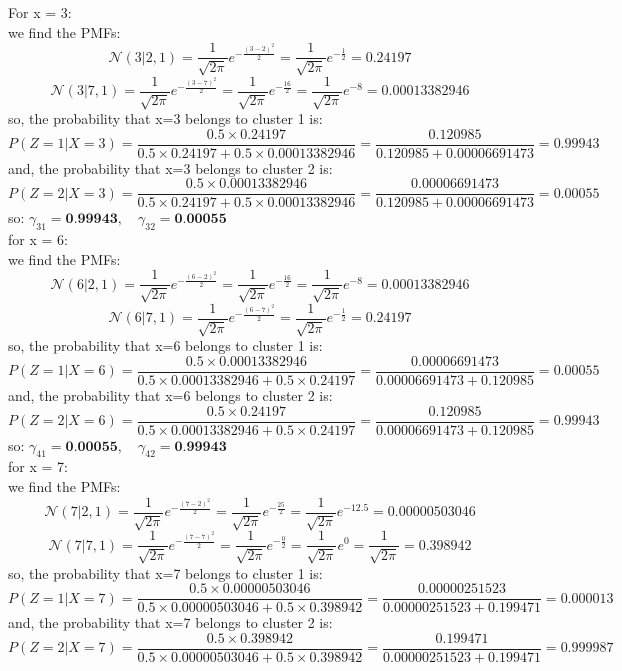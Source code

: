 \documentclass{article}
\begin{document}
\begin{enumerate}
For x = 3:
\\ we find the PMFs:
\[
\mathcal{N}(3 | 2, 1) = \frac{1}{\sqrt{2\pi}} e^{-\frac{(3-2)^2}{2}} = \frac{1}{\sqrt{2\pi}} e^{-\frac{1}{2}} = 0.24197
\]
\[
\mathcal{N}(3 | 7, 1) = \frac{1}{\sqrt{2\pi}} e^{-\frac{(3-7)^2}{2}} = \frac{1}{\sqrt{2\pi}} e^{-\frac{16}{2}} = \frac{1}{\sqrt{2\pi}} e^{-8} = 0.00013382946
\]
so, the probability that x=3 belongs to cluster 1 is:
\[
P(Z = 1 | X = 3) = \frac{0.5 \times 0.24197}{0.5 \times 0.24197 + 0.5 \times 0.00013382946} = \frac{0.120985}{0.120985 + 0.00006691473} = 0.99943
\]
and, the probability that x=3 belongs to cluster 2 is:
\[
P(Z = 2 | X = 3) = \frac{0.5 \times 0.00013382946}{0.5 \times 0.24197 + 0.5 \times 0.00013382946} = \frac{0.00006691473}{0.120985 + 0.00006691473} = 0.00055
\]
so: $\gamma_{31} = \textbf{0.99943}, \quad \gamma_{32} = \textbf{0.00055}$
\\ for x = 6:
\\ we find the PMFs:
\[
\mathcal{N}(6 | 2, 1) = \frac{1}{\sqrt{2\pi}} e^{-\frac{(6-2)^2}{2}} = \frac{1}{\sqrt{2\pi}} e^{-\frac{16}{2}} = \frac{1}{\sqrt{2\pi}} e^{-8} = 0.00013382946
\]
\[
\mathcal{N}(6 | 7, 1) = \frac{1}{\sqrt{2\pi}} e^{-\frac{(6-7)^2}{2}} = \frac{1}{\sqrt{2\pi}} e^{-\frac{1}{2}} = 0.24197
\]  
so, the probability that x=6 belongs to cluster 1 is:
\[
P(Z = 1 | X = 6) = \frac{0.5 \times 0.00013382946}{0.5 \times 0.00013382946 + 0.5 \times 0.24197} = \frac{0.00006691473}{0.00006691473 + 0.120985} = 0.00055
\]
and, the probability that x=6 belongs to cluster 2 is:
\[
P(Z = 2 | X = 6) = \frac{0.5 \times 0.24197}{0.5 \times 0.00013382946 + 0.5 \times 0.24197} = \frac{0.120985}{0.00006691473 + 0.120985} = 0.99943
\]
so: $\gamma_{41} = \textbf{0.00055}, \quad \gamma_{42} = \textbf{0.99943}$
\\ for x = 7:
\\ we find the PMFs:
\[
\mathcal{N}(7 | 2, 1) = \frac{1}{\sqrt{2\pi}} e^{-\frac{(7-2)^2}{2}} = \frac{1}{\sqrt{2\pi}} e^{-\frac{25}{2}} = \frac{1}{\sqrt{2\pi}} e^{-12.5} = 0.00000503046
\]
\[
\mathcal{N}(7 | 7, 1) = \frac{1}{\sqrt{2\pi}} e^{-\frac{(7-7)^2}{2}} = \frac{1}{\sqrt{2\pi}} e^{-\frac{0}{2}} = \frac{1}{\sqrt{2\pi}} e^{0} = \frac{1}{\sqrt{2\pi}} = 0.398942
\]
so, the probability that x=7 belongs to cluster 1 is:   
\[
P(Z = 1 | X = 7) = \frac{0.5 \times 0.00000503046}{0.5 \times 0.00000503046 + 0.5 \times 0.398942} = \frac{0.00000251523}{0.00000251523 + 0.199471} = 0.000013
\]
and, the probability that x=7 belongs to cluster 2 is:
\[
P(Z = 2 | X = 7) = \frac{0.5 \times 0.398942}{0.5 \times 0.00000503046 + 0.5 \times 0.398942} = \frac{0.199471}{0.00000251523 + 0.199471} = 0.999987
\]
\end{enumerate}
\end{document}
